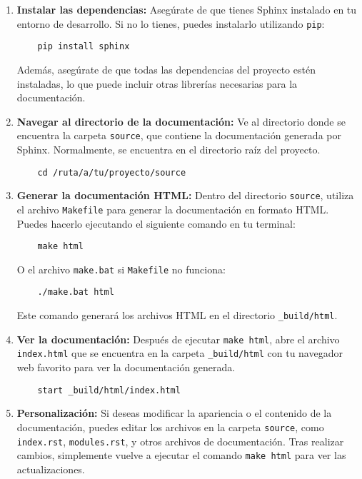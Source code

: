 \begin{enumerate}
    \item \textbf{Instalar las dependencias:}
    Asegúrate de que tienes Sphinx instalado en tu entorno de desarrollo. Si no lo tienes, puedes instalarlo utilizando \texttt{pip}:

    \begin{verbatim}
    pip install sphinx
    \end{verbatim}

    Además, asegúrate de que todas las dependencias del proyecto estén instaladas, lo que puede incluir otras librerías necesarias para la documentación.

    \item \textbf{Navegar al directorio de la documentación:}
    Ve al directorio donde se encuentra la carpeta \texttt{source}, que contiene la documentación generada por Sphinx. Normalmente, se encuentra en el directorio raíz del proyecto.

    \begin{verbatim}
    cd /ruta/a/tu/proyecto/source
    \end{verbatim}

    \item \textbf{Generar la documentación HTML:}
    Dentro del directorio \texttt{source}, utiliza el archivo \texttt{Makefile} para generar la documentación en formato HTML. Puedes hacerlo ejecutando el siguiente comando en tu terminal:

    \begin{verbatim}
    make html
    \end{verbatim}
    
    O el archivo \texttt{make.bat} si \texttt{Makefile} no funciona:
    
    \begin{verbatim}
    ./make.bat html
    \end{verbatim}

    Este comando generará los archivos HTML en el directorio \texttt{\_build/html}.

    \item \textbf{Ver la documentación:}
    Después de ejecutar \texttt{make html}, abre el archivo \texttt{index.html} que se encuentra en la carpeta \texttt{\_build/html} con tu navegador web favorito para ver la documentación generada.

    \begin{verbatim}
    start _build/html/index.html
    \end{verbatim}

    \item \textbf{Personalización:}
    Si deseas modificar la apariencia o el contenido de la documentación, puedes editar los archivos en la carpeta \texttt{source}, como \texttt{index.rst}, \texttt{modules.rst}, y otros archivos de documentación. Tras realizar cambios, simplemente vuelve a ejecutar el comando \texttt{make html} para ver las actualizaciones.
\end{enumerate}


